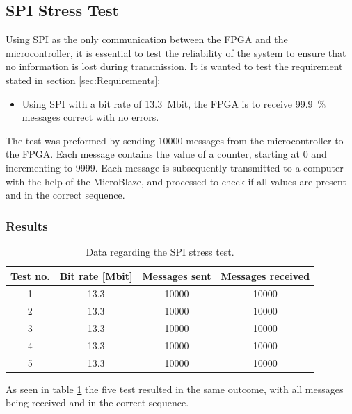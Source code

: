 \documentclass[../../main.tex]{subfiles}
\begin{document}
\subsection{SPI Stress Test}
Using SPI as the only communication between the FPGA and the microcontroller, it is essential to test the reliability of the system to ensure that no information is lost during transmission. It is wanted to test the requirement stated in section \ref{sec:Requirements}:
\begin{itemize}
    \item Using SPI with a bit rate of \SI{13,3}{\mega bit}, the FPGA is to receive \SI{99,9}{\percent} messages correct with no errors.
\end{itemize}
The test was preformed by sending 10000 messages from the microcontroller to the FPGA. Each message contains the value of a counter, starting at 0 and incrementing to 9999. Each message is subsequently transmitted to a computer with the help of the MicroBlaze, and processed to check if all values are present and in the correct sequence.  

\subsubsection*{Results}

\begin{table}[H]
\centering
\begin{tabular}{c|c c c}
\textbf{Test no.} & \textbf{Bit rate {[}Mbit{]}} & \textbf{Messages sent} & \textbf{Messages received} \\ \hline
1 & 13.3 & 10000 & 10000 \\
2 & 13.3 & 10000 & 10000 \\
3 & 13.3 & 10000 & 10000 \\
4 & 13.3 & 10000 & 10000 \\
5 & 13.3 & 10000 & 10000
\end{tabular}
\caption{Data regarding the SPI stress test.}
\label{tab:SPI-stresstest}
\end{table}

As seen in table \ref{tab:SPI-stresstest} the five test resulted in the same outcome, with all messages being received and in the correct sequence. 
\end{document}
